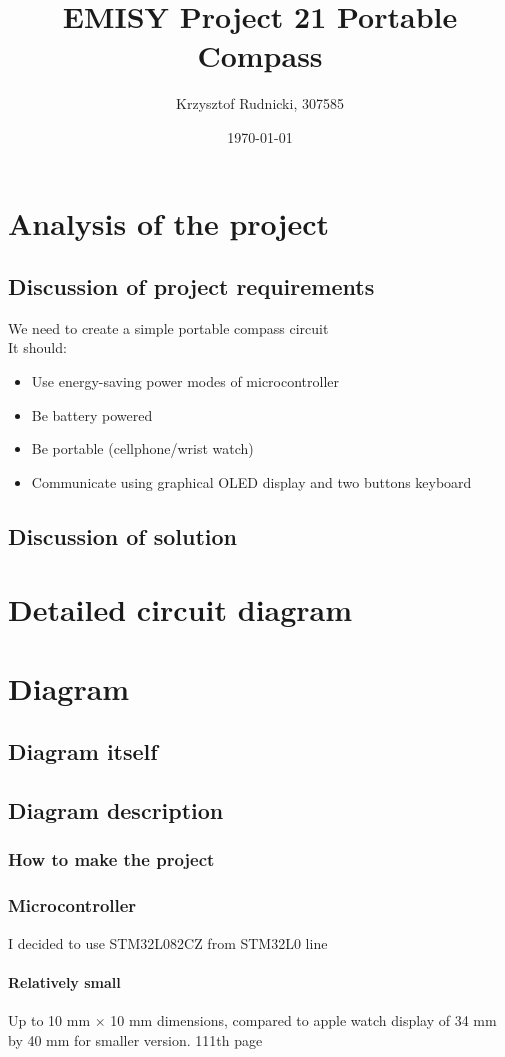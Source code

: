 \documentclass{article}
\title{EMISY Project 21 Portable Compass}
\author{Krzysztof Rudnicki, 307585}
\date{\today}
\begin{document}

\maketitle
\section{Analysis of the project}
\subsection{Discussion of project requirements}
We need to create a simple portable compass circuit \\
It should:
\begin{itemize}
	\item Use energy-saving power modes of microcontroller
	\item Be battery powered
	\item Be portable (cellphone/wrist watch)
	\item Communicate using graphical OLED display and two buttons keyboard
\end{itemize}
\subsection{Discussion of solution}
\section{Detailed circuit diagram}
\section{Diagram}
\subsection{Diagram itself}
\subsection{Diagram description}
\subsubsection{How to make the project}
\newpage
\subsubsection{Microcontroller}
I decided to use STM32L082CZ from STM32L0 line
\paragraph{Relatively small} Up to 10 mm $\times$ 10 mm dimensions, 
compared to apple watch display of 34 mm by 40 mm for smaller version. 
\cite{datasheet}
111th page
\end{document}
